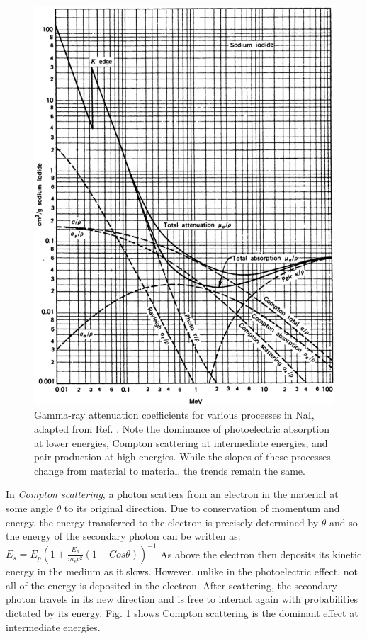 \begin{figure}[h!]
	\centerline{\includegraphics[height=0.5\textheight]{./img/c3/gamma_interactions_scan.eps}}
	\caption{Gamma-ray attenuation coefficients for various processes in NaI, adapted from Ref. \cite{knollBook}. Note the dominance of photoelectric absorption at lower energies, Compton scattering at intermediate energies, and pair production at high energies. While the slopes of these processes change from material to material, the trends remain the same.}
	\label{fig:chp3-gamma-interactions}
\end{figure}

In \emph{Compton scattering}, a \gr{} photon scatters from an electron in the material at some angle $\theta$ to its original direction\cite{Compton-PhysRev.21.483}. Due to conservation of momentum and energy, the energy transferred to the electron is precisely determined by $\theta$ and so the energy of the secondary photon can be written as: $E_{s}=E_{p}(1+\frac{E_{p}}{m_{e}c^2}(1-Cos\theta))^{-1}$ As above the electron then deposits its kinetic energy in the medium as it slows. However, unlike in the photoelectric effect, not all of the energy is deposited in the electron. After scattering, the secondary photon travels in its new direction and is free to interact again with probabilities dictated by its energy. Fig. \ref{fig:chp3-gamma-interactions} shows Compton scattering is the dominant effect at intermediate energies.


